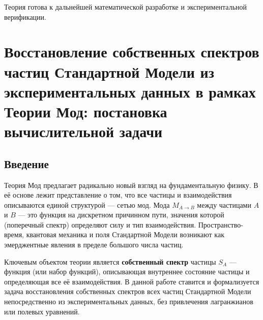 \documentclass[12pt,a4paper]{article}
\begin{document}
Теория готова к дальнейшей математической разработке и экспериментальной верификации.

\newpage
\section{Восстановление собственных спектров частиц Стандартной Модели из экспериментальных данных в рамках Теории Мод: постановка вычислительной задачи}

\begin{abstract}
В рамках Теории Мод ставится задача восстановления «собственных спектров» всех частиц Стандартной Модели. Собственный спектр частицы определяется как вектор в пространстве типов частиц, компоненты которого являются проекциями фундаментальной спектральной функции на направления других частиц. Задача формулируется как система алгебраических уравнений и ограничений, связывающих компоненты спектров с экспериментально измеренными величинами: константами связи, массами, спинами и калибровочными квантовыми числами. Показано, что система недоопределена (степеней свободы больше, чем уравнений), что отражает калибровочную свободу Теории Мод и указывает на необходимость дополнительных экспериментальных данных или теоретических принципов (например, принципа минимальной спектральной энтропии) для однозначного решения. Сформулирована оптимизационная задача, готовая для численного моделирования.

\bigskip
\noindent\textbf{Ключевые слова:} Теория Мод, собственный спектр, Стандартная Модель, обратная задача, калибровочная свобода, спектральная энтропия.
\end{abstract}

\subsection{Введение}
Теория Мод предлагает радикально новый взгляд на фундаментальную физику. В её основе лежит представление о том, что все частицы и взаимодействия описываются единой структурой --- сетью мод. Мода $M_{A \to B}$ между частицами $A$ и $B$ --- это функция на дискретном причинном пути, значения которой (поперечный спектр) определяют силу и тип взаимодействия. Пространство-время, квантовая механика и поля Стандартной Модели возникают как эмерджентные явления в пределе большого числа частиц.

Ключевым объектом теории является \textbf{собственный спектр} частицы $S_A$ --- функция (или набор функций), описывающая внутреннее состояние частицы и определяющая все её взаимодействия. В данной работе ставится и формализуется задача восстановления собственных спектров всех частиц Стандартной Модели непосредственно из экспериментальных данных, без привлечения лагранжианов или полевых уравнений.
\end{document}
